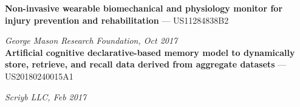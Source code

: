 
\textbf{Non-invasive wearable biomechanical and physiology monitor for injury prevention and rehabilitation} --- US11284838B2

\textit{George Mason Research Foundation, Oct 2017} \\

\textbf{Artificial cognitive declarative-based memory model to dynamically store, retrieve, and recall data derived from aggregate datasets } --- US20180240015A1

\textit{Scriyb LLC, Feb 2017} \\

